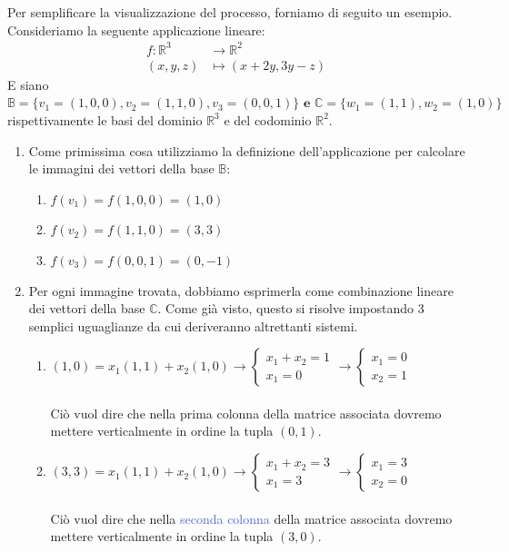 \documentclass[12pt]{report}
\newcommand{\R}{\mathbb{R}}
\newcommand{\C}{\mathbb{C}}
\begin{document}
\begin{itemize}
		Per semplificare la visualizzazione del processo, forniamo di seguito un esempio.
		Consideriamo la seguente applicazione lineare:
		\[
			\begin{aligned}
				f: \R^3 &\to \R^2\\
				(x, y, z) &\mapsto (x+2y, 3y-z)
			\end{aligned}
		\]
		E siano $\mathbb{B} = \{v_1 = (1, 0, 0), v_2 = (1, 1, 0), v_3 = (0, 0, 1)\} \textbf{ e } \C = \{w_1 = (1, 1), w_2 = (1, 0)\}$ rispettivamente le basi del dominio $\R^3$ e del codominio $\R^2$. 
		
		\begin{enumerate}
			
			\item Come primissima cosa utilizziamo la definizione dell'applicazione per calcolare le immagini dei vettori della base $\mathbb{B}$:
			\begin{enumerate}
				\item $f(v_1) = f(1, 0, 0) = (1, 0)$
				\item $f(v_2) = f(1, 1, 0) = (3, 3)$
				\item $f(v_3) = f(0, 0, 1) = (0, -1)$
			\end{enumerate}
			
			\item Per ogni immagine trovata, dobbiamo esprimerla come combinazione lineare dei vettori della base $\C$. Come già visto, questo si risolve impostando 3 semplici uguaglianze da cui deriveranno altrettanti sistemi.
			\begin{enumerate}
				
				\item $
					(1, 0) = x_1(1,1) + x_2(1,0) \to
					\begin{cases}
						x_1 + x_2 = 1\\
						x_1 = 0
					\end{cases}
					\to 
					\begin{cases}
						x_1 = 0\\
						x_2 = 1
					\end{cases}
				$\\\\
				Ciò vuol dire che nella \textcolor{BrickRed}{prima colonna} della matrice associata dovremo mettere verticalmente in ordine la tupla $(0, 1)$.
				
				\item $
					(3, 3) = x_1(1,1) + x_2(1,0) \to
					\begin{cases}
						x_1 + x_2 = 3\\
						x_1 = 3
					\end{cases}
					\to 
					\begin{cases}
						x_1 = 3\\
						x_2 = 0
					\end{cases}
				$\\\\
				Ciò vuol dire che nella \textcolor{RoyalBlue}{seconda colonna} della matrice associata dovremo mettere verticalmente in ordine la tupla $(3, 0)$.
				

\end{enumerate}
\end{enumerate}
\end{itemize}
\end{document}
